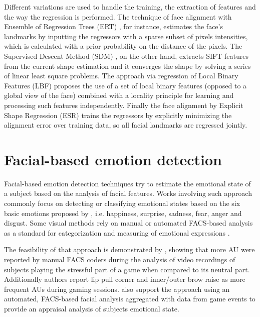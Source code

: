 Different variations are used to handle the training, the extraction of features and the way the regression is performed. The technique of face alignment with Ensemble of Regression Trees (ERT) \parencite{kazemi2014one}, for instance, estimates the face's landmarks by inputting the regressors with a sparse subset of pixels intensities, which is calculated with a prior probability on the distance of the pixels. The Supervised Descent Method (SDM) \parencite{xiong2013supervised}, on the other hand, extracts SIFT features from the current shape estimation and it converges the shape by solving a series of linear least square problems. The approach via regression of Local Binary Features (LBF) \parencite{ren2014face} proposes the use of a set of local binary features (opposed to a global view of the face) combined with a locality principle for learning and processing such features independently. Finally the face alignment by Explicit Shape Regression (ESR) \parencite{cao2014face} trains the regressors by explicitly minimizing the alignment error over training data, so all facial landmarks are regressed jointly.

\section{Facial-based emotion detection}
\label{ch:literature-face-emotion-detection}

Facial-based emotion detection techniques try to estimate the emotional state of a subject based on the analysis of facial features. Works involving such approach commonly focus on detecting or classifying emotional states based on the six basic emotions proposed by \textcite{ekman1971constants}, i.e. happiness, surprise, sadness, fear, anger and disgust. Some visual methods rely on manual or automated FACS-based analysis as a standard for categorization and measuring of emotional expressions \parencite{bartlett1999measuring}.

The feasibility of that approach is demonstrated by \textcite{kaiser1994multi}, showing that more AU were reported by manual FACS coders during the analysis of video recordings of subjects playing the stressful part of a game when compared to its neutral part. Additionally authors report lip pull corner and inner/outer brow raise as more frequent AUs during gaming sessions. \textcite{wehrle2000emotion} also support the approach using an automated, FACS-based facial analysis aggregated with data from game events to provide an appraisal analysis of subjects emotional state.

